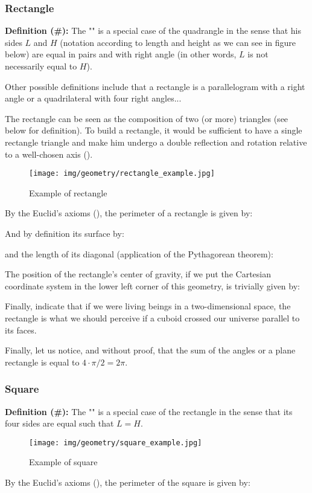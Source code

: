 {	\subsubsection{Rectangle}
	\textbf{Definition (\#\mydef):} The "" is a special case of the quadrangle in the sense that his sides $L$ and $H$ (notation according to length and height as we can see in figure below) are equal in pairs and with right angle (in other words, $L$ is not necessarily equal to $H$).
	
	Other possible definitions include that a rectangle is a parallelogram with a right angle or a quadrilateral with four right angles...
	
	\begin{tcolorbox}[title=Remark,colframe=black,arc=10pt]
	The rectangle can be seen as the composition of two (or more) triangles (see below for definition). To build a rectangle, it would be sufficient to have a single rectangle triangle and make him undergo a double reflection and rotation relative to a well-chosen axis ().
	\end{tcolorbox}
	
	\begin{figure}[H]
		\centering
		\texttt{[image: img/geometry/rectangle\_example.jpg]}
		\caption{Example of rectangle}
	\end{figure}
	By the Euclid's axioms (), the perimeter of a rectangle is given by:
	
	And by definition its surface by:
	
	and the length of its  diagonal (application of the Pythagorean theorem):
	
	The position of the rectangle's center of gravity, if we put the Cartesian coordinate system in the lower left corner of this geometry, is trivially given by:
	
	Finally, indicate that if we were living beings in a two-dimensional space, the rectangle is what we should perceive if a cuboid crossed our universe parallel to its faces.
	
	Finally, let us notice, and without proof, that the sum of the angles or a plane rectangle is equal to $4\cdot \pi/2=2\pi$.
	
	\subsubsection{Square}
	\textbf{Definition (\#\mydef):} The "" is a special case of the rectangle in the sense that its four sides are equal such that $L=H$.
	\begin{figure}[H]
		\centering
		\texttt{[image: img/geometry/square\_example.jpg]}
		\caption{Example of square}
	\end{figure}
	By the Euclid's axioms (), the perimeter of the square is given by:
	
}
